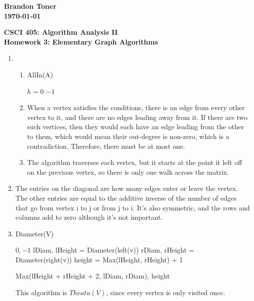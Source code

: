 \documentclass{article}%
\begin{document}
\begin{flushright}
\textbf{Brandon Toner \\
\today}
\end{flushright}

\begin{center}
\textbf{CSCI 405: Algorithm Analysis II \\
Homework 3: Elementary Graph Algorithms} \\
\end{center}

\begin{enumerate}
\item 
\begin{enumerate}
\item AllIn(A) \\
\begin{algorithm}[H]
 $h = 0$\;
 \Return $-1$
\end{algorithm}
\item When a vertex satisfies the conditions, there is an edge from every other vertex to it, and there are no edges leading away from it.  If there are two such vertices, then they would each have an edge leading from the other to them, which would mean their out-degree is non-zero, which is a contradiction. Therefore, there must be at most one.
\item The algorithm traverses each vertex, but it starts at the point it left off on the previous vertex, so there is only one walk across the matrix.
\end{enumerate}
\item The entries on the diagonal are how many edges enter or leave the vertex.  The other entries are equal to the additive inverse of the number of edges that go from vertex i to j or from j to i.  It's also symmetric, and the rows and columns add to zero although it's not important.
\item  Diameter(V) \\
\begin{algorithm}[H]
  {\Return $0, -1$}
 lDiam, lHeight = Diameter(left(v))\;
 rDiam, rHeight = Diameter(right(v))\;
 height = Max(lHeight, rHeight) + 1\;
 
 \Return Max(lHeight + rHeight + 2, lDiam, rDiam), height\;
\end{algorithm}

This algorithm is $Theata(V)$, since every vertex is only visited once.
\end{enumerate}
\end{document}
